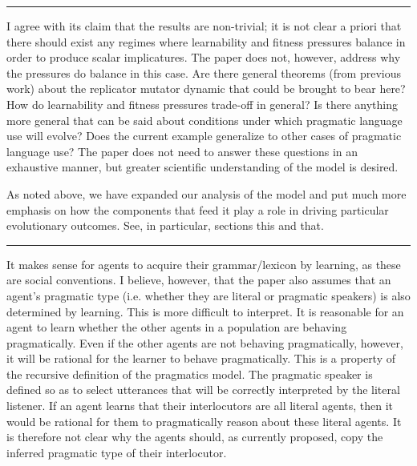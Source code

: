 \documentclass[12pt,a4paper]{article}
\newcommand{\hl}[1]{\textcolor[rgb]{.8,.33,.0}{#1}}%
\begin{document}
\vspace{0.5cm}

\noindent\rule{\textwidth}{1pt}

\begin{mdframed}[backgroundcolor=gray!25,linecolor=gray!25,frametitle= Reviewer \thereviewerCounter~comment \thereviewerCommentCounter \hfill ~~({\it Model predictions})]
%
I agree with its claim that the results are non-trivial; it is not clear a priori that there should exist any regimes where learnability and fitness pressures balance in order to produce scalar implicatures. The paper does not, however, address why the pressures do balance in this case. Are there general theorems (from previous work) about the replicator mutator dynamic that could be brought to bear here? How do learnability and fitness pressures trade-off in general? Is there anything more general that can be said about conditions under which pragmatic language use will evolve? Does the current example generalize to other cases of pragmatic language use? The paper does not need to answer these questions in an exhaustive manner, but greater scientific understanding of the model is desired.
\end{mdframed}

As noted above, we have expanded our analysis of the model and put much more emphasis on how the components that feed it play a role in driving particular evolutionary outcomes. See, in particular, \hl{sections this and that}. 
%

\vspace{0.5cm}

\noindent\rule{\textwidth}{1pt}

\begin{mdframed}[backgroundcolor=gray!25,linecolor=gray!25,frametitle= Reviewer \thereviewerCounter~comment \thereviewerCommentCounter \hfill ~~({\it co-evolution and pragmatic maintenance})]
%
It makes sense for agents to acquire their grammar/lexicon by learning, as these are social conventions. I believe, however, that the paper also assumes that an agent's pragmatic type (i.e. whether they are literal or pragmatic speakers) is also determined by learning. This is more difficult to interpret. It is reasonable for an agent to learn whether the other agents in a population are behaving pragmatically. Even if the other agents are not behaving pragmatically, however, it will be rational for the learner to behave pragmatically. This is a property of the recursive definition of the pragmatics model. The pragmatic speaker is defined so as to select utterances that will be correctly interpreted by the literal listener. If an agent learns that their interlocutors are all literal agents, then it would be rational for them to pragmatically reason about these literal agents. It is therefore not clear why the agents should, as currently proposed, copy the inferred pragmatic type of their interlocutor.
\end{mdframed}
\end{document}
